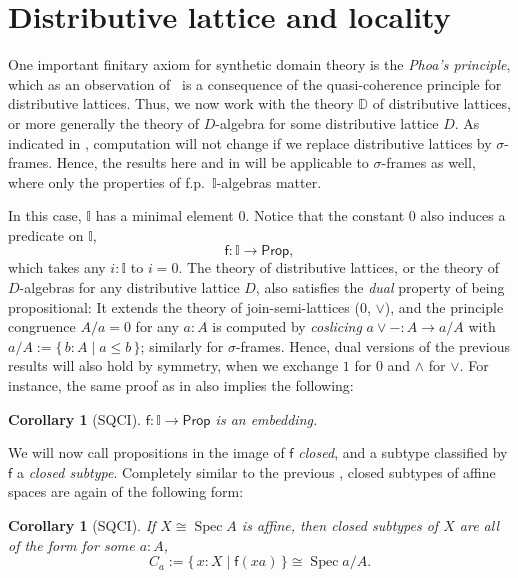 \documentclass[12pt]{amsart}
\newtheorem{corollary}[theorem]{Corollary}
\theoremstyle{definition}
\newcommand{\mbb}[1]{\mathbb{#1}}
\newcommand{\I}{\mbb I}
\newcommand{\ms}[1]{\mathsf{#1}}
\newcommand{\scomp}[2]{\{\,#1\mid#2\,\}}
\newcommand{\pp}{\ms{Prop}}
\newcommand{\spec}{\operatorname{Spec}}
\begin{document}
\section{Distributive lattice and locality}\label{sec:locality}

One important finitary axiom for synthetic domain theory is the \emph{Phoa's principle}, which as an observation of~\cite{gratzer2024directed} is a consequence of the quasi-coherence principle for distributive lattices. Thus, we now work with the theory $\mbb D$ of distributive lattices, or more generally the theory of $D$-algebra for some distributive lattice $D$. As indicated in , computation will not change if we replace distributive lattices by $\sigma$-frames. Hence, the results here and in  will be applicable to $\sigma$-frames as well, where only the properties of f.p.\ $\I$-algebras matter.

In this case, $\I$ has a minimal element $0$. Notice that the constant $0$ also induces a predicate on $\I$,
\[ \ms f : \I \to \pp, \]
which takes any $i : \I$ to $i = 0$. The theory of distributive lattices, or the theory of $D$-algebras for any distributive lattice $D$, also satisfies the \emph{dual} property of being propositional: It extends the theory of join-semi-lattices ($0$, $\vee$), and the principle congruence $A/a = 0$ for any $a:A$ is computed by \emph{coslicing} $a \vee - : A \to a/A$ with $a/A := \scomp{b:A}{a \le b}$; similarly for $\sigma$-frames. Hence, dual versions of the previous results will also hold by symmetry, when we exchange $1$ for $0$ and $\wedge$ for $\vee$. For instance, the same proof as in  also implies the following:

\begin{corollary}[SQCI]
  $\ms f : \I \to \pp$ is an embedding.
\end{corollary}

We will now call propositions in the image of $\ms f$ \emph{closed}, and a subtype classified by $\ms f$ a \emph{closed subtype}. Completely similar to the previous , closed subtypes of affine spaces are again of the following form:

\begin{corollary}[SQCI]\label{cor:closedaffinealgebra}
  If $X \cong \spec A$ is affine, then closed subtypes of $X$ are all of the form for some $a:A$,
  \[ C_a := \scomp{x : X}{\ms f(xa)} \cong \spec a/A. \]
\end{corollary}
\end{document}
